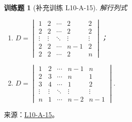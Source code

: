 \documentclass[UTF8,12pt,a4paper,fontset=fandol]{ctexart}
\newtheorem{exercise}{训练题}[section]
\begin{document}
\begin{exercise}[补充训练 L10-A-15]\label{prob:L10-A-15}
解行列式
        \begin{enumerate}
            \item $D=\begin{vmatrix}
                          1      & 2      & \cdots & 2      & 2      \\
                          2      & 2      & \cdots & 2      & 2      \\
                          \vdots & \vdots & \ddots & \vdots & \vdots \\
                          2      & 2      & \cdots & n-1    & 2      \\
                          2      & 2      & \cdots & 2      & n\end{vmatrix}$；

            \item $D=\begin{vmatrix}
                          1      & 2      & \cdots & n-1    & n      \\
                          2      & 3      & \cdots & n      & 1      \\
                          3      & 4      & \cdots & 1      & 2      \\
                          \vdots & \vdots & \ddots & \vdots & \vdots \\
                          n      & 1      & \cdots & n-2    & n-1
                      \end{vmatrix}$.
        \end{enumerate}
\end{exercise}
\noindent 来源：\href{https://github.com/yhwu-is/Linear-Algebra-Left-Undone/blob/new/%E8%AE%B2%E4%B9%89/%E4%B8%93%E9%A2%98/10%20%E8%A1%8C%E5%88%97%E5%BC%8F.tex}{L10-A-15}。
\end{document}
